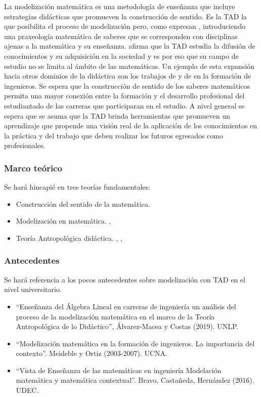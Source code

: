 La modelización matemática es una metodología de enseñanza que incluye estrategias didácticas que promueven la construcción de sentido. Es la TAD la que posibilita el proceso de modelización pero, como expresan \textcite{sanchez2017}, introduciendo una praxeología matemática de saberes que se corresponden con disciplinas ajenas a la matemática y su enseñanza. \textcite{garcia2019} afirma que la TAD estudia la difusión de conocimientos y su adquisición en la sociedad y es por eso que su campo de estudio no se limita al ámbito de las matemáticas. Un ejemplo de esta expansión hacia otros dominios de la didáctica son los trabajos de \textcite{florensa2018} y de \textcite{bartolome2019} en la formación de ingenieros. Se espera que la construcción de sentido de los saberes matemáticos permita una mayor conexión entre la formación y el desarrollo profesional del estudiantado de las carreras que participaran en el estudio. A nivel general se espera que se asuma que la TAD brinda herramientas que promueven un aprendizaje que propende una visión real de la aplicación de los conocimientos en la práctica y del trabajo que deben realizar los futuros egresados como profesionales.

\subsubsection{Marco teórico}

Se hará hincapié en tres teorías fundamentales:
\begin{itemize}
	\item Construcción del sentido de la matemática. \textcite{chevallard1999-11}
	\item Modelización en matemática. \textcite{florensa2020}, \textcite{brito2011}
	\item Teoría Antropológica didáctica. \textcite{chevallard1999-11}, \textcite{garcia2019}, \textcite{bartolome2019}
\end{itemize}

\subsubsection{Antecedentes}

Se hará referencia a los pocos antecedentes sobre modelización con TAD en el nivel universitario.

\begin{itemize}
	\item “Enseñanza del Álgebra Lineal en carreras de ingeniería un análisis del proceso de la modelización matemática en el marco de la Teoría Antropológica de lo Didáctico”, Álvarez-Macea y Costas (2019). UNLP.
	\item “Modelización matemática en la formación de ingenieros. La importancia del contexto”. Meideble y Ortiz (2003-2007). UCNA.
	\item “Vista de Enseñanza de las matemáticas en ingeniería Modelación matemática y matemática contextual”. Bravo, Castañeda, Hernández (2016). UDEC.
\end{itemize}

